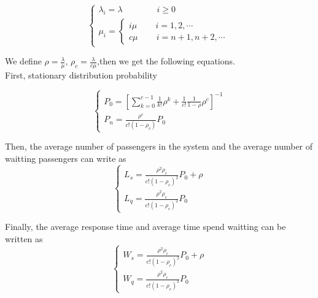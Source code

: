 \documentclass{mcmthesis}
\begin{document}
\begin{equation}    
\left  \{
       \begin{array}{lr}
         \lambda_i=\lambda  \qquad \qquad i\geqslant 0\\
           \mu_i=\left  \{
       \begin{array}{lr}
         i\mu  \qquad\, i=1,2,\cdots\\
            c\mu\qquad\, i=n+1,n+2,\cdots
        \end{array}
\right.
        \end{array}
\right.
\end{equation}

We define $\rho=\frac{\lambda}{\mu}$, $\rho_c=\frac{\lambda}{c\mu}$,then we get the following equations.
\\First, stationary distribution probability 

\begin{equation}    
\left  \{
       \begin{array}{lr}
           P_0=[\sum\limits_{k=0}^{c-1}\frac{1}{k!}\rho ^k+\frac{1}{c!}\frac{1}{1-\rho}\rho ^c]^{-1}\\ \label{eq3}
            P_n=\frac{\rho ^c}{c!(1-\rho_c)}P_0
        \end{array}
\right.
\end{equation}


Then, the average number of passengers in the system and the average number of waitting passengers can write as
\begin{equation}    
\left  \{
       \begin{array}{lr}
           L_s=\frac{\rho ^2\rho_c}{c!(1-\rho_c)^2}P_0 +\rho \\ \label{eq4}
          L_q=\frac{\rho ^2\rho_c}{c!(1-\rho_c)^2}P_0 
        \end{array}
\right.
\end{equation}

Finally, the average response time and average time spend waitting can be written as
\begin{equation}    
\left  \{
       \begin{array}{lr}
           W_s=\frac{\rho ^2\rho_c}{c!(1-\rho_c)^2}P_0 +\rho \\ \label{eq5}
          W_q=\frac{\rho ^2\rho_c}{c!(1-\rho_c)^2}P_0 
        \end{array}
\right.
\end{equation}
\end{document}
